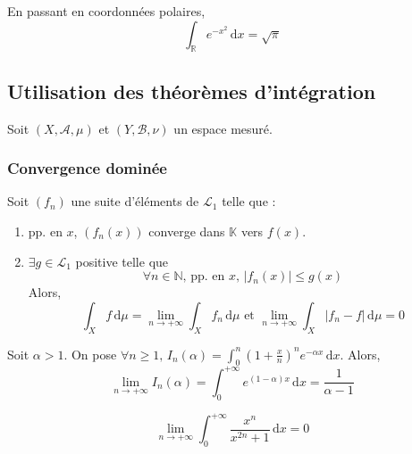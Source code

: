   \begin{application}
    En passant en coordonnées polaires,
    \[ \int_{\mathbb{R}} e^{-x^2} \, \mathrm{d}x = \sqrt{\pi} \]
  \end{application}

  \subsection{Utilisation des théorèmes d'intégration}

  Soit $(X, \mathcal{A}, \mu)$ et $(Y, \mathcal{B}, \nu)$ un espace mesuré.

  \subsubsection{Convergence dominée}


  \begin{theorem}
    Soit $(f_n)$ une suite d'éléments de $\mathcal{L}_1$ telle que :
    \begin{enumerate}[label={\bfseries(\roman*)}]
      \item pp. en $x$, $(f_n(x))$ converge dans $\mathbb{K}$ vers $f(x)$.
      \item $\exists g \in \mathcal{L}_1$ positive telle que
      \[ \forall n \in \mathbb{N}, \, \text{pp. en } x, \, \vert f_n(x) \vert \leq g(x) \]
      Alors,
      \[ \int_X f \, \mathrm{d}\mu = \lim_{n \rightarrow +\infty} \int_X f_n \, \mathrm{d}\mu \text{ et } \lim_{n \rightarrow +\infty} \int_X \vert f_n - f \vert \, \mathrm{d}\mu = 0 \]
    \end{enumerate}
  \end{theorem}

  \begin{example}
    Soit $\alpha > 1$. On pose $\forall n \geq 1, \, I_n(\alpha) = \int_0^n \left( 1 + \frac{x}{n} \right)^n e^{-\alpha x} \, \mathrm{d}x$. Alors,
    \[ \lim_{n \rightarrow +\infty} I_n(\alpha) = \int_0^{+\infty} e^{(1-\alpha)x} \, \mathrm{d}x = \frac{1}{\alpha - 1} \]
  \end{example}


  \begin{example}
    \[ \lim_{n \rightarrow +\infty} \int_{0}^{+\infty} \frac{x^n}{x^{2n} + 1} \, \mathrm{d}x = 0 \]
  \end{example}

